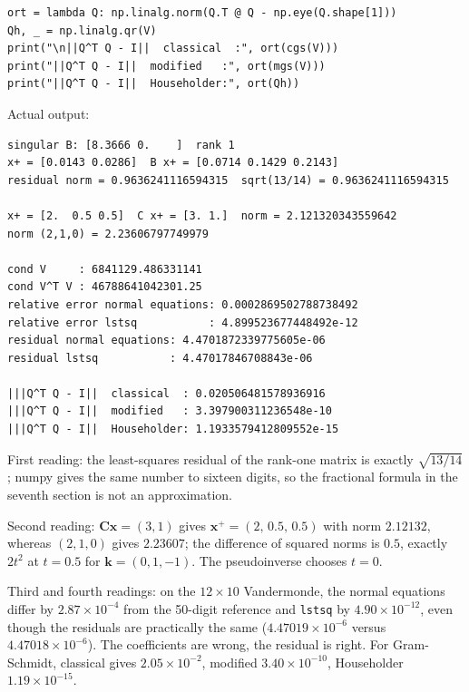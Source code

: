 \begin{lab}
\begin{verbatim}
ort = lambda Q: np.linalg.norm(Q.T @ Q - np.eye(Q.shape[1]))
Qh, _ = np.linalg.qr(V)
print("\n||Q^T Q - I||  classical  :", ort(cgs(V)))
print("||Q^T Q - I||  modified   :", ort(mgs(V)))
print("||Q^T Q - I||  Householder:", ort(Qh))
\end{verbatim}
Actual output:
\begin{verbatim}
singular B: [8.3666 0.    ]  rank 1
x+ = [0.0143 0.0286]  B x+ = [0.0714 0.1429 0.2143]
residual norm = 0.9636241116594315  sqrt(13/14) = 0.9636241116594315

x+ = [2.  0.5 0.5]  C x+ = [3. 1.]  norm = 2.121320343559642
norm (2,1,0) = 2.23606797749979

cond V     : 6841129.486331141
cond V^T V : 46788641042301.25
relative error normal equations: 0.0002869502788738492
relative error lstsq           : 4.899523677448492e-12
residual normal equations: 4.4701872339775605e-06
residual lstsq           : 4.47017846708843e-06

|||Q^T Q - I||  classical  : 0.020506481578936916
|||Q^T Q - I||  modified   : 3.397900311236548e-10
|||Q^T Q - I||  Householder: 1.1933579412809552e-15
\end{verbatim}
\end{lab}

First reading: the least-squares residual of the rank-one matrix is exactly
$\sqrt{13/14}$; numpy gives the same number to sixteen digits, so the fractional formula
in the seventh section is not an approximation.

Second reading: $\mathbf{C}\mathbf{x}=(3,1)$ gives
$\mathbf{x}^{+}=(2,\,0.5,\,0.5)$ with norm $2.12132$, whereas $(2,1,0)$ gives
$2.23607$; the difference of squared norms is $0.5$, exactly $2t^{2}$ at $t=0.5$ for
$\mathbf{k}=(0,1,-1)$. The pseudoinverse chooses $t=0$.

Third and fourth readings: on the $12\times10$ Vandermonde, the normal equations differ by
$2.87\times10^{-4}$ from the 50-digit reference and \texttt{lstsq} by $4.90\times10^{-12}$,
even though the residuals are practically the same ($4.47019\times10^{-6}$ versus $4.47018\times10^{-6}$).
The coefficients are wrong, the residual is right. For Gram-Schmidt,
classical gives $2.05\times10^{-2}$, modified $3.40\times10^{-10}$, Householder
$1.19\times10^{-15}$.

